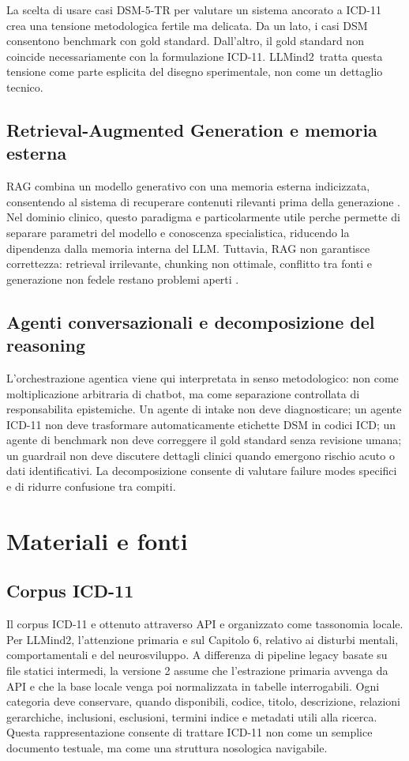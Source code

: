 \documentclass[11pt,a4paper]{article}
\newcommand{\llmind}{LLMind2}
\begin{document}
La scelta di usare casi DSM-5-TR per valutare un sistema ancorato a ICD-11 crea una tensione metodologica fertile ma delicata. Da un lato, i casi DSM consentono benchmark con gold standard. Dall'altro, il gold standard non coincide necessariamente con la formulazione ICD-11. \llmind\ tratta questa tensione come parte esplicita del disegno sperimentale, non come un dettaglio tecnico.

\subsection{Retrieval-Augmented Generation e memoria esterna}
RAG combina un modello generativo con una memoria esterna indicizzata, consentendo al sistema di recuperare contenuti rilevanti prima della generazione \citep{lewis2020rag}. Nel dominio clinico, questo paradigma e particolarmente utile perche permette di separare parametri del modello e conoscenza specialistica, riducendo la dipendenza dalla memoria interna del LLM. Tuttavia, RAG non garantisce correttezza: retrieval irrilevante, chunking non ottimale, conflitto tra fonti e generazione non fedele restano problemi aperti \citep{li2022survey}.

\subsection{Agenti conversazionali e decomposizione del reasoning}
L'orchestrazione agentica viene qui interpretata in senso metodologico: non come moltiplicazione arbitraria di chatbot, ma come separazione controllata di responsabilita epistemiche. Un agente di intake non deve diagnosticare; un agente ICD-11 non deve trasformare automaticamente etichette DSM in codici ICD; un agente di benchmark non deve correggere il gold standard senza revisione umana; un guardrail non deve discutere dettagli clinici quando emergono rischio acuto o dati identificativi. La decomposizione consente di valutare failure modes specifici e di ridurre confusione tra compiti.

\section{Materiali e fonti}
\subsection{Corpus ICD-11}
Il corpus ICD-11 e ottenuto attraverso API e organizzato come tassonomia locale. Per \llmind, l'attenzione primaria e sul Capitolo 6, relativo ai disturbi mentali, comportamentali e del neurosviluppo. A differenza di pipeline legacy basate su file statici intermedi, la versione 2 assume che l'estrazione primaria avvenga da API e che la base locale venga poi normalizzata in tabelle interrogabili. Ogni categoria deve conservare, quando disponibili, codice, titolo, descrizione, relazioni gerarchiche, inclusioni, esclusioni, termini indice e metadati utili alla ricerca. Questa rappresentazione consente di trattare ICD-11 non come un semplice documento testuale, ma come una struttura nosologica navigabile.
\end{document}
